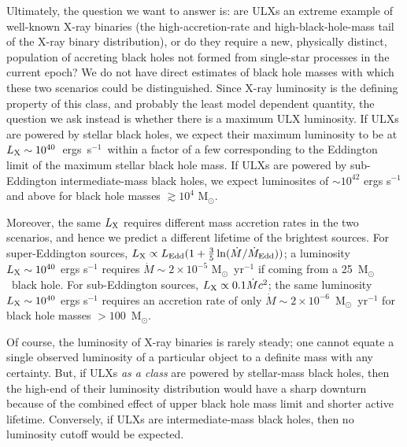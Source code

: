 \documentclass{article}
\newcommand{\msun}{M$_{\odot}$}
\newcommand{\ergl}{ergs~s$^{-1}$}
\begin{document}
Ultimately, the question we want to answer is: are ULXs an extreme
example of well-known X-ray binaries (the high-accretion-rate and
high-black-hole-mass tail of the X-ray binary distribution), or do they require
a new, physically distinct, population of accreting black holes not formed
from single-star processes in the current epoch?
%
We do not have direct estimates of black hole masses with which these
 two scenarios could be distinguished. Since X-ray luminosity is the defining
property of this class, and probably the least model dependent
quantity, the question we ask instead is whether there is a maximum ULX luminosity.
%
If ULXs are powered by stellar black holes, we expect their maximum luminosity to be %
at $L_{\rm X} \sim 10^{40}$~\ergl\ within a factor of a few corresponding to the 
 Eddington limit of the maximum stellar black hole mass. 
If ULXs are powered by sub-Eddington intermediate-mass black holes, we expect
luminosites of %
$\sim 10^{42}$ ergs s$^{-1}$ and above for black hole masses $\gtrsim 10^4 $ \msun.

Moreover, the same $L_{\rm X}$
requires different mass accretion rates in the two scenarios,
and hence we predict a different lifetime of the brightest sources.
For super-Eddington sources,
$L_{\rm X} \propto L_{\rm Edd} (1+ \frac{3}{5} \ln (\dot{M}/\dot{M}_{\rm Edd}))$; a luminosity
$L_{\rm X} \sim 10^{40}$ ergs s$^{-1}$ requires
$\dot{M} \sim 2 \times 10^{-5} $ \msun\ yr$^{-1}$ if coming from
a 25~\msun\ black hole. 
For sub-Eddington sources, $L_{\rm X} \propto 0.1 \dot{M} c^2$;
the same luminosity $L_{\rm X} \sim 10^{40}$ ergs s$^{-1}$
requires an accretion rate of only $\dot{M} \sim 2 \times 10^{-6}$~\msun\
yr$^{-1}$ for black hole masses $> 100$~\msun. 

Of course, the luminosity of X-ray binaries is rarely steady; one cannot equate 
a single observed luminosity of a particular object to a definite mass with any certainty.
But, if ULXs {\sl as a class} are powered by stellar-mass black holes, then
the high-end of their luminosity distribution would have a sharp downturn
because of the combined effect of upper black hole mass limit and shorter active lifetime.
Conversely, if ULXs are intermediate-mass black holes, then no luminosity cutoff would be expected.
 
\end{document}
